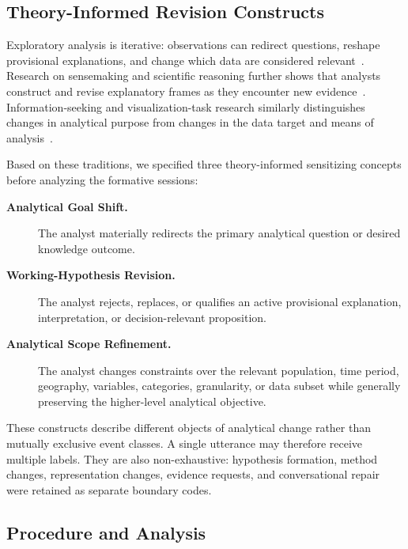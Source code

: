 \documentclass[journal]{IEEEtran}
\begin{document}
\subsection{Theory-Informed Revision Constructs}
\label{sec:formative-constructs}

Exploratory analysis is iterative: observations can redirect questions,
reshape provisional explanations, and change which data are considered
relevant~\cite{russell1993cost,pirolli2005sensemaking,
battle2019characterizing}. Research on sensemaking and scientific reasoning
further shows that analysts construct and revise explanatory frames as they
encounter new evidence~\cite{klein2007dataframe,pontis2016influence,
klahr1988dual}. Information-seeking and visualization-task research similarly
distinguishes changes in analytical purpose from changes in the data target
and means of analysis~\cite{bates1989berrypicking,vakkari2001changes,
brehmer2013multilevel}.

Based on these traditions, we specified three theory-informed sensitizing
concepts before analyzing the formative sessions:

\begin{description}
\item[\textbf{Analytical Goal Shift.}]
The analyst materially redirects the primary analytical question or
desired knowledge outcome.


\item[\textbf{Working-Hypothesis Revision.}]
The analyst rejects, replaces, or qualifies an active provisional
explanation, interpretation, or decision-relevant proposition.

\item[\textbf{Analytical Scope Refinement.}]
The analyst changes constraints over the relevant population, time period,
geography, variables, categories, granularity, or data subset while
generally preserving the higher-level analytical objective.

\end{description}

These constructs describe different objects of analytical change rather than
mutually exclusive event classes. A single utterance may therefore receive
multiple labels. They are also non-exhaustive: hypothesis formation, method
changes, representation changes, evidence requests, and conversational repair
were retained as separate boundary codes.

\subsection{Procedure and Analysis}
\label{sec:formative-procedure}
\end{document}
